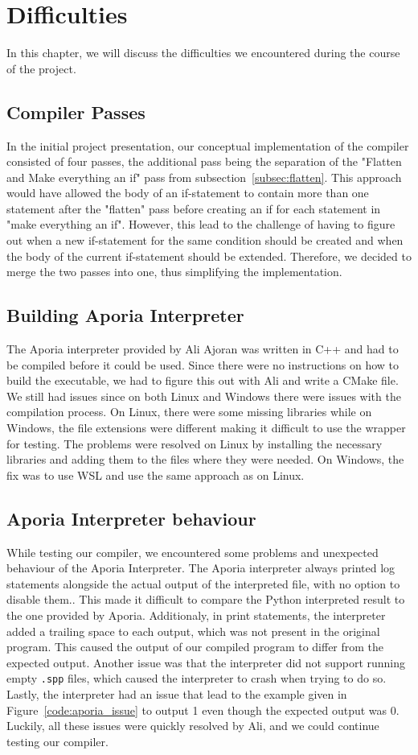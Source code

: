\section{Difficulties}
In this chapter, we will discuss the difficulties we encountered during the course of the project.

\subsection{Compiler Passes}
In the initial project presentation, our conceptual implementation of the compiler consisted of four passes, the additional pass being the separation of the "Flatten and Make everything an if" pass from subsection~\ref{subsec:flatten}. This approach would have allowed the body of an if-statement to contain more than one statement after the "flatten" pass before creating an if for each statement in "make everything an if". However, this lead to the challenge of having to figure out when a new if-statement for the same condition should be created and when the body of the current if-statement should be extended. Therefore, we decided to merge the two passes into one, thus simplifying the implementation.

\subsection{Building Aporia Interpreter}
The Aporia interpreter provided by Ali Ajoran was written in C++ and had to be compiled before it could be used. Since there were no instructions on how to build the executable, we had to figure this out with Ali and write a CMake file. We still had issues since on both Linux and Windows there were issues with the compilation process. On Linux, there were some missing libraries while on Windows, the file extensions were different making it difficult to use the wrapper for testing. The problems were resolved on Linux by installing the necessary libraries and adding them to the files where they were needed. On Windows, the fix was to use WSL and use the same approach as on Linux.

\subsection{Aporia Interpreter behaviour}
While testing our compiler, we encountered some problems and unexpected behaviour of the Aporia Interpreter. The Aporia interpreter always printed log statements alongside the actual output of the interpreted file, with no option to disable them.. This made it difficult to compare the Python interpreted result to the one provided by Aporia.
Additionaly, in print statements, the interpreter added a trailing space to each output, which was not present in the original program. This caused the output of our compiled program to differ from the expected output.
Another issue was that the interpreter did not support running empty \texttt{.spp} files, which caused the interpreter to crash when trying to do so.
Lastly, the interpreter had an issue that lead to the example given in Figure~\ref{code:aporia_issue} to output 1 even though the expected output was 0.
Luckily, all these issues were quickly resolved by Ali, and we could continue testing our compiler.


